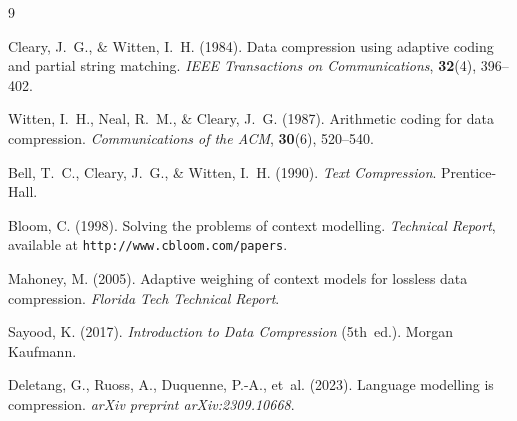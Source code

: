 \begin{thebibliography}{9}

Cleary, J.~G., \& Witten, I.~H. (1984).
Data compression using adaptive coding and partial string matching.
\textit{IEEE Transactions on Communications}, \textbf{32}(4), 396--402.

Witten, I.~H., Neal, R.~M., \& Cleary, J.~G. (1987).
Arithmetic coding for data compression.
\textit{Communications of the ACM}, \textbf{30}(6), 520--540.

Bell, T.~C., Cleary, J.~G., \& Witten, I.~H. (1990).
\textit{Text Compression}.
Prentice-Hall.

Bloom, C. (1998).
Solving the problems of context modelling.
\textit{Technical Report}, available at \texttt{http://www.cbloom.com/papers}.

Mahoney, M. (2005).
Adaptive weighing of context models for lossless data compression.
\textit{Florida Tech Technical Report}.

Sayood, K. (2017).
\textit{Introduction to Data Compression} (5th~ed.).
Morgan Kaufmann.

Deletang, G., Ruoss, A., Duquenne, P.-A., et~al. (2023).
Language modelling is compression.
\textit{arXiv preprint arXiv:2309.10668}.

\end{thebibliography}
